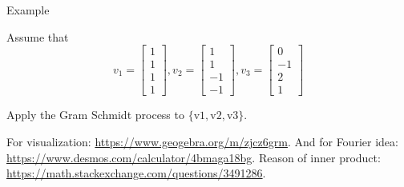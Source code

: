 \documentclass[11pt]{beamer}
\theoremstyle{plain}
\begin{document}
\begin{frame}{Example}
    \begin{example}
        Assume that
$$
v_1=\left[\begin{array}{l}
1 \\
1 \\
1 \\
1
\end{array}\right], v_2=\left[\begin{array}{c}
1 \\
1 \\
-1 \\
-1
\end{array}\right], v_3=\left[\begin{array}{c}
0 \\
-1 \\
2 \\
1
\end{array}\right]
$$


Apply the Gram Schmidt process to $\{\mathrm{v} 1, \mathrm{v} 2, \mathrm{v} 3\}$.
    \end{example}
    For visualization: \url{https://www.geogebra.org/m/zjcz6grm}. 
    And for Fourier idea: \url{https://www.desmos.com/calculator/4bmaga18bg}. Reason of inner product: \url{https://math.stackexchange.com/questions/3491286}.
\end{frame}
\end{document}
